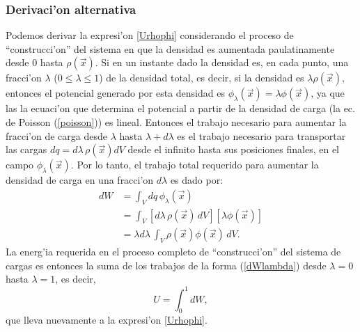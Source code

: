 \subsubsection{Derivaci'on alternativa}
Podemos derivar la expresi'on \eqref{Urhophi} considerando el proceso de ``construcci'on'' del sistema en que la densidad es aumentada paulatinamente desde 0 hasta $\rho(\vec{x})$. Si en un instante dado la densidad es, en cada punto, una fracci'on $\lambda$ ($0\le\lambda\le 1$) de la densidad total, es decir, si la densidad es $\lambda\rho(\vec{x})$, entonces el potencial generado por esta densidad es $\phi_\lambda(\vec{x})=\lambda\phi(\vec{x})$, ya que las la ecuaci'on que determina el potencial a partir de la densidad de carga (la ec. de Poisson (\ref{poisson})) es lineal. Entonces el trabajo necesario para aumentar la fracci'on de carga desde $\lambda$ hasta $\lambda+d\lambda$ es el trabajo necesario para transportar las cargas $dq=d\lambda\,\rho(\vec{x})dV$ desde el infinito hasta sus posiciones finales, en el campo $\phi_\lambda(\vec{x})$. Por lo tanto, el trabajo total requerido para aumentar la densidad de carga en una fracci'on $d\lambda$ es dado por:
\begin{align}
dW &= \int_V dq\,\phi_\lambda(\vec{x}) \\
&= \int_V \left[d\lambda\,\rho(\vec{x})\,dV\right]\left[\lambda\phi(\vec{x})\right] \\
&= \lambda d\lambda\,\int_V \rho(\vec{x})\phi(\vec{x}) \,dV . \label{dWlambda}
\end{align}
La energ'ia requerida en el proceso completo de ``construcci'on'' del sistema de cargas es entonces la suma de los trabajos de la forma (\ref{dWlambda}) desde $\lambda=0$ hasta $\lambda=1$, es decir,
\begin{equation}
U=\int_0^1dW,
\end{equation}
que lleva nuevamente a la expresi'on \eqref{Urhophi}.

